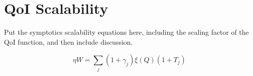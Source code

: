 
\section{QoI Scalability}
\label{sec:qoi_scalability}

Put the symptotics scalability equations here, including the scaling factor of the QoI function, and then include discussion.

\begin{equation}
	\eta W = \sum_{j} ( 1 + \gamma_j) \xi (Q) ( 1 + T_j )
\end{equation}
